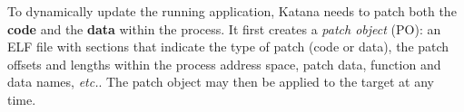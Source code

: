 
To dynamically update the running application, Katana needs to patch
both the {\bf code} and the {\bf data} within the process.  It first
creates a {\it patch object} (PO): an ELF file with sections that
indicate the type of patch (code or data), the patch offsets and
lengths within the process address space, patch data, function and
data names, {\it etc.}. The patch object may then be applied to the
target at any time.
